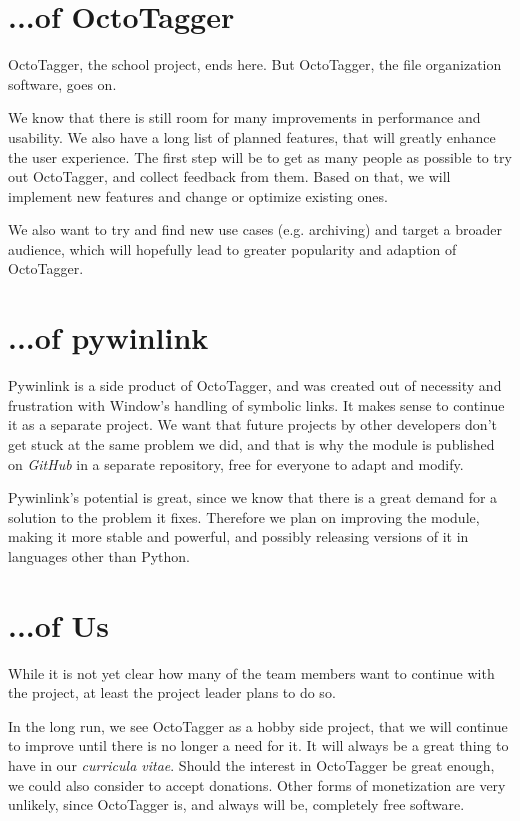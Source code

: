 \section{...of OctoTagger}

OctoTagger, the school project, ends here. But OctoTagger, the file organization software, goes on. 

We know that there is still room for many improvements in performance and usability. We also have a long list of planned features, that will greatly enhance the user experience.
The first step will be to get as many people as possible to try out OctoTagger, and collect feedback from them. Based on that, we will implement new features and change or optimize existing ones. 

We also want to try and find new use cases (e.g. archiving) and target a broader audience, which will hopefully lead to greater popularity and adaption of OctoTagger.

\section{...of pywinlink}

Pywinlink is a side product of OctoTagger, and was created out of necessity and frustration with Window's handling of symbolic links. It makes sense to continue it as a separate project. We want that future projects by other developers don't get stuck at the same problem we did, and that is why the module is published on \textit{GitHub} in a separate repository, free for everyone to adapt and modify.

Pywinlink's potential is great, since we know that there is a great demand for a solution to the problem it fixes. Therefore we plan on improving the module, making it more stable and powerful, and possibly releasing versions of it in languages other than Python.

\section{...of Us}

While it is not yet clear how many of the team members want to continue with the project, at least the project leader plans to do so.

In the long run, we see OctoTagger as a hobby side project, that we will continue to improve until there is no longer a need for it. It will always be a great thing to have in our \textit{curricula vitae}. Should the interest in OctoTagger be great enough, we could also consider to accept donations. Other forms of monetization are very unlikely, since OctoTagger is, and always will be, completely free software.